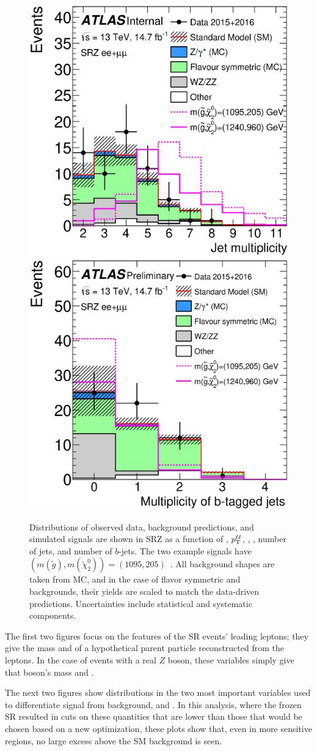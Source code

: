 \begin{centering}
\begin{figure}[!hbt]
\includegraphics[width=.48\linewidth]{figures/results/njets_ee_mm_srz_R_a.eps}
\includegraphics[width=.48\linewidth]{figures/results/nbjets_ee_mm_srz_R_a.eps}
\caption{ Distributions of observed data, background predictions, and simulated signals are shown in SRZ as a function of \mll, $p_{\text{T}}^{\ell\ell}$, \met, \HT, number of jets, and number of $b$-jets. The two example signals have $(m(\tilde{g}),m(\tilde{\chi}^{0}_{2}))=(1095, 205)$~\GeV. All background shapes are taken from \ac{MC}, and in the case of flavor symmetric and \dyjets backgrounds, their yields are scaled to match the data-driven predictions. Uncertainties include statistical and systematic components.}
\label{fig:results_srdists}
\end{figure}
\end{centering}

The first two figures focus on the features of the \ac{SR} events' leading leptons; they give the mass and \pt of a hypothetical parent particle reconstructed from the leptons. In the case of events with a real $Z$ boson, these variables simply give that boson's mass and \pt. 

The next two figures show distributions in the two most important variables used to differentiate signal from background, \met and \HT. In this analysis, where the frozen \ac{SR} resulted in cuts on these quantities that are lower than those that would be chosen based on a new optimization, these plots show that, even in more sensitive regions, no large excess above the \ac{SM} background is seen. 

